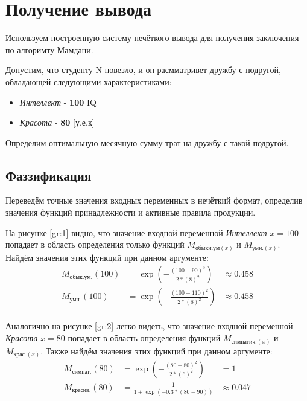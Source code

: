 \documentclass[12pt, a4paper]{article}
\begin{document}
\section{Получение вывода}
Используем построенную систему нечёткого вывода для получения заключения по алгоримту Мамдани.

Допустим, что студенту N повезло, и он расмматривет дружбу с подругой, обладающей следующими характеристиками:

\begin{itemize}
\item \textit{Интеллект} - \textbf{100} IQ 
\item \textit{Красота} - \textbf{80} [у.е.к] 
\end{itemize}
Определим оптимальную месячную сумму трат на дружбу с такой подругой.

\subsection{Фаззификация}
Переведём точные значения входных переменных в нечёткий формат, определив значения функций принадлежности и активные правила продукции.

На рисунке \ref{gr:1} видно, что значение входной переменной \textit{Интеллект} $x=100$ попадает в область определения только функций $M_{\text{обыкн.ум}(x)}$ и $M_{\text{умн.}(x)}$. Найдём значения этих функций при данном аргументе:
\begin{equation*}
\begin{aligned}
M_{\text{обык.ум.}}(100) &= \exp{\left( -\frac{(100-90)^2}{2 * (8)^2}  \right)} &\approx 0.458 \\
M_{\text{умн.}}(100) &= \exp{\left( -\frac{(100-110)^2}{2 * (8)^2}  \right)} &\approx 0.458 \\
\end{aligned}
\end{equation*}

Аналогично на рисунке \ref{gr:2} легко видеть, что значение входной переменной \textit{Красота} $x=80$ попадает в область определения функций $M_{\text{симпатич.}(x)}$ и $M_{\text{крас.}(x)}$. Также найдём значения этих функций при данном аргументе:
\begin{equation*}
\begin{aligned}
M_{\text{симпат.}}(80) &= \exp{\left( -\frac{(80-80)^2}{2 * (6)^2}  \right)} &= 1\\
M_{\text{красив.}}(80) &= \frac{1}{1+\exp \left( -0.3 * (80-90) \right)} 	&\approx 0.047\\
\end{aligned}
\end{equation*}
\end{document}
